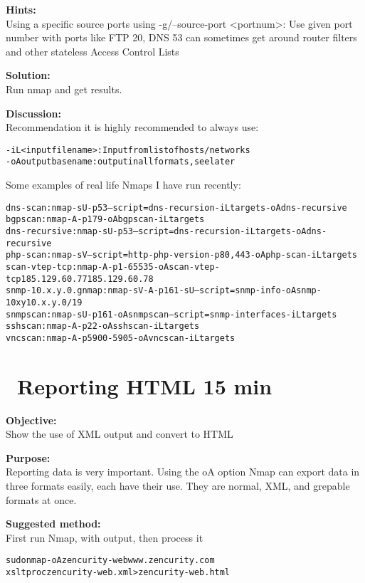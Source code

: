 \documentclass[a4paper,11pt,notitlepage]{report}
\begin{document}
{\bf Hints:} \\
Using a specific source ports using -g/--source-port <portnum>: Use given port number with ports like FTP 20, DNS 53 can sometimes get around router filters and other stateless Access Control Lists

{\bf Solution:}\\
Run nmap and get results.

{\bf Discussion:}\\
Recommendation it is highly recommended to always use:
\begin{alltt}
-iL <inputfilename>: Input from list of hosts/networks
-oA outputbasename: output in all formats, see later
\end{alltt}

Some examples of real life Nmaps I have run recently:
\begin{alltt}
dns-scan: nmap -sU -p 53 --script=dns-recursion -iL targets -oA dns-recursive
bgpscan: nmap -A -p 179 -oA bgpscan -iL targets
dns-recursive: nmap -sU -p 53 --script=dns-recursion -iL targets -oA dns-recursive
php-scan: nmap -sV --script=http-php-version -p80,443 -oA php-scan -iL targets
scan-vtep-tcp: nmap -A -p 1-65535 -oA scan-vtep-tcp 185.129.60.77 185.129.60.78
snmp-10.x.y.0.gnmap: nmap -sV -A -p 161 -sU --script=snmp-info -oA snmp-10xy 10.x.y.0/19
snmpscan: nmap -sU -p 161 -oA snmpscan --script=snmp-interfaces -iL targets
sshscan: nmap -A -p 22 -oA sshscan -iL targets
vncscan: nmap -A -p 5900-5905 -oA vncscan -iL targets
\end{alltt}




\chapter{\faInfoCircle\ Reporting HTML 15 min}
\label{ex:nmap-html}


{\bf Objective:} \\
Show the use of XML output and convert to HTML

{\bf Purpose:}\\
Reporting data is very important. Using the oA option Nmap can export data in three formats easily, each have their use. They are normal, XML, and grepable formats at once.

{\bf Suggested method:}\\
First run Nmap, with output, then process it
\begin{alltt}
  sudo nmap -oA zencurity-web www.zencurity.com
  xsltproc zencurity-web.xml > zencurity-web.html
\end{alltt}
\end{document}
